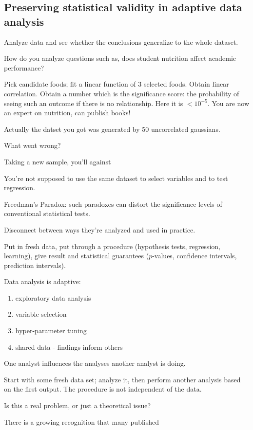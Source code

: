 \subsection{Preserving statistical validity in adaptive data analysis}

Analyze data and see whether the conclusions generalize to the whole dataset.

How do you analyze questions such as, does student nutrition affect academic performance?

Pick candidate foods; fit a linear function of 3 selected foods. Obtain linear correlation. Obtain a number which is the significance score: the probability of seeing such an outcome if there is no relationship. Here it is $<10^{-5}$. You are now an expert on nutrition, can publish books!

Actually the datset you got was generated by 50 uncorrelated gaussians.

What went wrong? 

Taking a new sample, you'll against

You're not supposed to use the same dataset to select variables and to test regression.

Freedman's Paradox: such paradoxes can distort the significance levels of conventional statistical tests.

Disconnect between ways they're analyzed and used in practice.

Put in fresh data, put through a procedure (hypothesis tests, regression, learning), give result and statistical guarantees ($p$-values, confidence intervals, prediction intervals). 

Data analysis is adaptive:
\begin{enumerate}
\item
exploratory data analysis
\item 
variable selection
\item
hyper-parameter tuning
\item
shared data - findings inform others
\end{enumerate}
One analyst influences the analyses another analyst is doing. 

Start with some fresh data set; analyze it, then perform another analysis based on the first output. The procedure is not independent of the data.

Is this a real problem, or just a theoretical issue? 

There is a growing recognition that many published 

